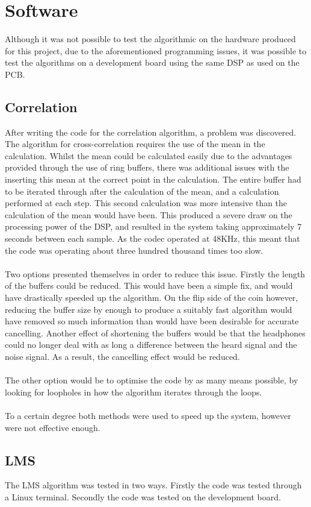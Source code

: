 \section{Software}

Although it was not possible to test the algorithmic on the hardware produced for this project, due to the aforementioned programming issues, it was possible to test the algorithms on a development board using the same DSP as used on the PCB.

\subsection{Correlation}
After writing the code for the correlation algorithm, a problem was discovered.
The algorithm for cross-correlation requires the use of the mean in the calculation.
Whilst the mean could be calculated easily due to the advantages provided through the use of ring buffers, there was additional issues with the inserting this mean at the correct point in the calculation.
The entire buffer had to be iterated through after the calculation of the mean, and a calculation performed at each step.
This second calculation was more intensive than the calculation of the mean would have been.
This produced a severe draw on the processing power of the DSP, and resulted in the system taking approximately 7 seconds between each sample.
As the codec operated at 48KHz, this meant that the code was operating about three hundred thousand times too slow.
\\
\\
Two options presented themselves in order to reduce this issue.
Firstly the length of the buffers could be reduced.
This would have been a simple fix, and would have drastically speeded up the algorithm.
On the flip side of the coin however, reducing the buffer size by enough to produce a suitably fast algorithm would have removed so much information than would have been desirable for accurate cancelling.
Another effect of shortening the buffers would be that the headphones could no longer deal with as long a difference between the heard signal and the noise signal.
As a result, the cancelling effect would be reduced.
\\
\\
The other option would be to optimise the code by as many means possible, by looking for loopholes in how the algorithm iterates through the loops.
\\
\\
To a certain degree both methods were used to speed up the system, however were not effective enough.

\subsection{LMS}

The LMS algorithm was tested in two ways.
Firstly the code was tested through a Linux terminal.
Secondly the code was tested on the development board.
